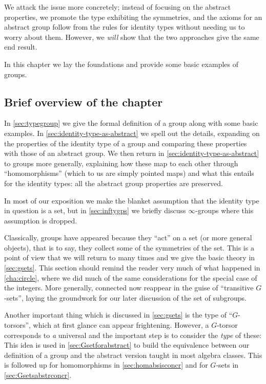 We attack the issue more concretely;
instead of focusing on the abstract properties,
we promote the type exhibiting the symmetries,
and the axioms for an abstract group follow from the rules for identity types
without needing us to worry about them.
However, we \emph{will} show that the two approaches give the same end result.

In this chapter we lay the foundations and provide some basic examples of groups.  

\subsection{Brief overview of the chapter}
In \cref{sec:typegroup} we give the formal definition of a group along with some basic examples.  
In \cref{sec:identity-type-as-abstract} we spell out the details, expanding on the properties of the identity type of a group and comparing these properties with those of an abstract group.  We then return in \cref {sec:identity-type-as-abstract} to groups more generally, explaining how these map to each other through ``homomorphisms'' (which to us are simply pointed maps) and what this entails for the identity types: all the abstract group properties are preserved.  

In most of our exposition we make the blanket assumption that the identity type in question is a set, but in \cref{sec:inftygps} we briefly discuss $\infty$-groups where this assumption is dropped.

Classically, groups have appeared because they ``act'' on a set (or more general objects), that is to say, they collect some of the symmetries of the set.  This is a point of view that we will return to many times and we give the basic theory in \cref{sec:gsets}.  
This section should remind the reader very much of what happened in \cref{cha:circle}, where we did much of the same considerations for the special case of the integers.  
More generally, connected \coverings now reappear in the guise of ``transitive $G$-sets'', laying the groundwork for our later discussion of the set of subgroups.  

Another important thing which is discussed in \cref{sec:gsets} is the type of ``$G$-torsors'', which at first glance can appear frightening.  
However, a $G$-torsor corresponds to \emph{a} universal \covering and the important step is to consider the \emph{type} of these:
This idea is used in \cref{sec:Gsetforabstract} to build the equivalence between our definition of a group and the abstract version taught in most algebra classes.  This is followed up for homomorphisms in \cref{sec:homabsisconcr} and for $G$-sets in \cref{sec:Gsetsabstrconcr}.

